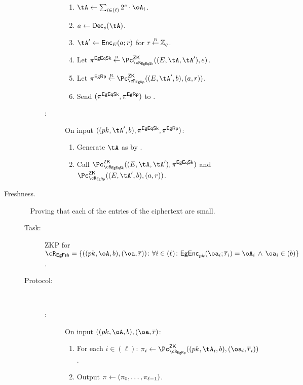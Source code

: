 \begin{description}
\begin{description}
\begin{description}
		\begin{enumerate}
		
			\item    $\tA \asn  \sum_{i\in (\ell)}    2^c \cdot \oA_i$. 
			
			\item   $a \asn  \Dec_e(\tA)$.
			
			\item   $\tA' \asn \Enc_E(a;r)$ for $r\mathbin{\stackrel{\mbox{\tiny R}}{\leftarrow}} {\mathbb Z}_q$.
			
				
			
			\item  Let  $\pi^\EgEqSkS \getsr \pZK{\rEgEqSk}((E,\tA,\tA'
			), e)$.
				
			\item  Let  $\pi^\EgRps \getsr \pZK{\rEgRp}((E,\tA',b), (a,r))$.
			
			\item Send $(\pi^{{\sf EgEqSk}},\pi^{{\sf EgRp}})$ to \Vc.
		\end{enumerate}
		
		
		\item[\Vc:] On input $((\pk,\tA',b),\pi^\EgEqSkS,\pi^\EgRps)$:
		
		\begin{enumerate}
			\item   Generate $\tA$ as by \Pc.
			\item  Call $\pZK{\rEgEqSk}((E,\tA,\tA'
			), \pi^\EgEqSkS)$ and  $\pZK{\rEgRp}((E,\tA',b), (a,r))$.
			
		\end{enumerate}
		
	\end{description}

	
\end{description}
	
\item[Freshness.]  ~
Proving that each of the entries of the  ciphertext are small. 

\begin{description}
	\item[Task:] ZKP for $\rtFsh =\rtFshDef$.

\item[Protocol:]~

\begin{description}	
	\item[\Pc:] On  input  $((\pk,\oA,b),(\oa,\orr)$:
	
	\begin{enumerate}
		\item For each $i\in (\ell)$: $\pi_i \asn \pZK{\rEgRp}((\pk,\tA_i,b), (\oa_i,\orr_i))$.
		\item Output $\pi \leftarrow (\pi_0,\ldots, \pi_{\ell-1})$.
	\end{enumerate}
	 

\end{description}
\end{description}
\end{description}
